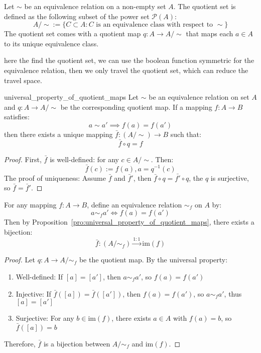 \documentclass[11pt,lang=en]{elegantbook}
\begin{document}
\begin{definition}
  Let $\sim$ be an equivalence relation on a non-empty set $A$. The quotient set is defined as the following subset of the power set $\mathcal{P}(A)$:
  \[
    A/{\sim} := \{C \subset A : C \text{ is an equivalence class with respect to } \sim\}
  \]
  The quotient set comes with a quotient map $q: A \to A/{\sim}$ that maps each $a \in A$ to its unique equivalence class.
\end{definition}

\begin{remark}
  here the find the quotient set, we can use the boolean function symmetric for the equivalence relation, then we only travel the quotient set, which can reduce the travel space. 
\end{remark}

\begin{proposition}{universal_property_of_quotient_maps}
  Let $\sim$ be an equivalence relation on set $A$ and $q: A \to A/{\sim}$ be the corresponding quotient map. If a mapping $f: A \to B$ satisfies:
  \[
    a \sim a' \implies f(a) = f(a')
  \]
  then there exists a unique mapping $\bar{f}: (A/{\sim}) \to B$ such that:
  \[
    \bar{f} \circ q = f
  \]
\end{proposition}

\begin{proof}
  First, $\bar{f}$ is well-defined: for any $c \in A/{\sim}$. Then: 
  \[
    \bar{f}(c) := f(a), a = q^{-1}(c)
  \]
  The proof of uniqueness: Assume $\bar{f}$ and $\bar{f}'$, then $\bar{f}\circ q=\bar{f'} \circ q$, the $q$ is surjective, so $\bar{f}=\bar{f}'$. 
\end{proof}

\begin{proposition}
  For any mapping $f : A \to B$, define an equivalence relation $\sim_f$ on $A$ by:
  \[
    a \sim_f a' \iff f(a) = f(a')
  \]
  Then by Proposition~\ref{pro:universal_property_of_quotient_maps}, there exists a bijection:
  \[
    \bar{f} : (A/{\sim_f}) \xrightarrow{1:1} \text{im}(f)
  \]
\end{proposition}

\begin{proof}
  Let $q: A \to A/{\sim_f}$ be the quotient map. By the universal property:
  \begin{enumerate}
    \item Well-defined: If $[a] = [a']$, then $a \sim_f a'$, so $f(a) = f(a')$
    
    \item Injective: If $\bar{f}([a]) = \bar{f}([a'])$, then $f(a) = f(a')$,
          so $a \sim_f a'$, thus $[a] = [a']$
    
    \item Surjective: For any $b \in \text{im}(f)$, there exists $a \in A$
          with $f(a) = b$, so $\bar{f}([a]) = b$
  \end{enumerate}
  Therefore, $\bar{f}$ is a bijection between $A/{\sim_f}$ and $\text{im}(f)$.
\end{proof}
\end{document}
